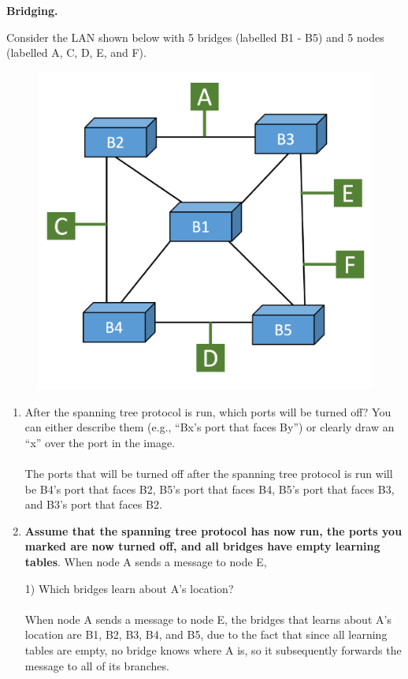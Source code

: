 \documentclass[10pt]{article}
\newenvironment{problem}[2][]{\begin{trivlist}
\item[\hskip \labelsep {\bfseries #1}\hskip \labelsep {\bfseries #2.}]}{\end{trivlist}}
\begin{document}
\newpage
\textbf{Bridging.}
\begin{problem}{4: Bridges and Spanning Tree}
Consider the LAN shown below with 5 bridges (labelled B1 - B5) and 5 nodes (labelled A, C, D, E, and F). 

\begin{figure}[h]
    \centering
    \includegraphics[scale=0.4]{figures/bridges.pdf}
    \label{fig:bin_search}
\end{figure}


\begin{enumerate}[label=(\alph*)]
    \item After the spanning tree protocol is run, which ports will be turned off? You can either describe them (e.g., ``Bx's port that faces By'') or clearly draw an ``x'' over the port in the image. \\\\
    The ports that will be turned off after the spanning tree protocol is run will be B4's port that faces B2, B5's port that faces B4, B5's port that faces B3, and B3's port that faces B2.
    \item  \textbf{Assume that the spanning tree protocol has now run, the ports you marked are now turned off, and all bridges have empty learning tables}. When node A sends a message to node E, 
    
    1) Which bridges learn about A's location? \\\\
    When node A sends a message to node E, the bridges that learns about A's location are B1, B2, B3, B4, and B5, due to the fact that since all learning tables are empty, no bridge knows where A is, so it subsequently forwards the message to all of its branches.


\end{enumerate}
\end{problem}
\end{document}
